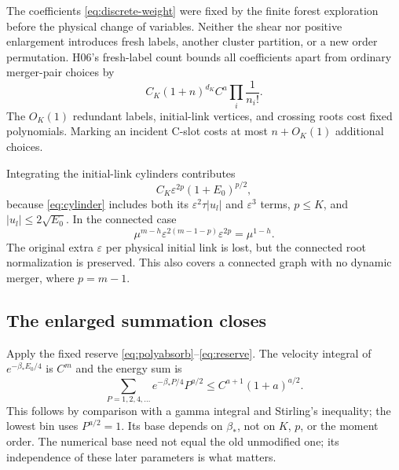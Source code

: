 \documentclass[11pt]{article}
\newcommand{\eps}{\varepsilon}
\theoremstyle{definition}\newtheorem{definition}[theorem]{Definition}
\theoremstyle{remark}\newtheorem{remark}[theorem]{Remark}
\numberwithin{equation}{section}
\begin{document}
The coefficients \eqref{eq:discrete-weight} were fixed by the finite forest
exploration before the physical change of variables. Neither the shear nor
positive enlargement introduces fresh labels, another cluster partition,
or a new order permutation. H06's fresh-label count bounds all coefficients
apart from ordinary merger-pair choices by
\[
 C_K(1+n)^{d_K}C^a\prod_i\frac1{n_i!}.
\]
The $O_K(1)$ redundant labels, initial-link vertices, and crossing roots
cost fixed polynomials. Marking an incident C-slot costs at most
$n+O_K(1)$ additional choices.

Integrating the initial-link cylinders contributes
\[
 C_K\eps^{2p}(1+E_0)^{p/2},
\]
because \eqref{eq:cylinder} includes both its $\eps^2\tau|u_l|$ and
$\eps^3$ terms, $p\le K$, and $|u_l|\le2\sqrt{E_0}$. In the connected case
\begin{equation}\label{eq:scale}
 \mu^{m-h}\eps^{2(m-1-p)}\eps^{2p}=\mu^{1-h}.
\end{equation}
The original extra $\eps$ per physical initial link is lost, but the
connected root normalization is preserved. This also covers a connected
graph with no dynamic merger, where $p=m-1$.

\subsection{The enlarged summation closes}\label{subsec:summation}
Apply the fixed reserve \eqref{eq:polyabsorb}--\eqref{eq:reserve}.
The velocity integral of $e^{-\beta_*E_0/4}$ is $C^m$ and the energy sum is
\begin{equation}\label{eq:energy-sum}
 \sum_{P=1,2,4,\ldots}e^{-\beta_*P/4}P^{a/2}
        \le C^{a+1}(1+a)^{a/2}.
\end{equation}
This follows by comparison with a gamma integral and Stirling's inequality;
the lowest bin uses $P^{a/2}=1$. Its base depends on $\beta_*$, not on
$K$, $p$, or the moment order. The numerical base need not equal the old
unmodified one; its independence of these later parameters is what matters.
\end{document}
